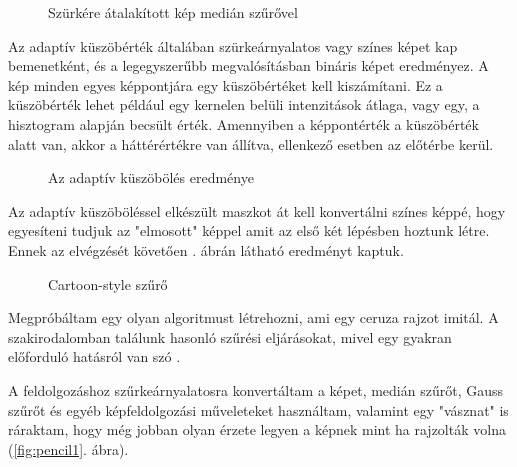 \begin{figure}[ht]
\centering
{}
\caption{Szürkére átalakított kép medián szűrővel} 
\label{fig:cartoon3}
\end{figure}

\newpage


Az adaptív küszöbérték általában szürkeárnyalatos vagy színes képet kap bemenetként, és a legegyszerűbb megvalósításban bináris képet eredményez. A kép minden egyes képpontjára egy küszöbértéket kell kiszámítani. Ez a küszöbérték lehet például egy kernelen belüli intenzitások átlaga, vagy egy, a hisztogram alapján becsült érték. Amennyiben a képpontérték a küszöbérték alatt van, akkor a háttérértékre van állítva, ellenkező esetben az előtérbe kerül.

\begin{figure}[ht]
\centering
{}
\caption{Az adaptív küszöbölés eredménye} 
\label{fig:cartoon4}
\end{figure}


Az adaptív küszöböléssel elkészült maszkot át kell konvertálni színes képpé, hogy egyesíteni tudjuk az "elmosott" képpel amit az első két lépésben hoztunk létre. Ennek az elvégzését követően . ábrán látható eredményt kaptuk.

\begin{figure}[ht]
\centering
{}
\caption{Cartoon-style szűrő } 
\label{fig:cartoon5}
\end{figure}




Megpróbáltam egy olyan algoritmust létrehozni, ami egy ceruza rajzot imitál. A szakirodalomban találunk hasonló szűrési eljárásokat, mivel egy gyakran előforduló hatásról van szó \cite{emami}.

A feldolgozáshoz szűrkeárnyalatosra konvertáltam a képet, medián szűrőt, Gauss szűrőt és egyéb képfeldolgozási műveleteket használtam, valamint egy "vásznat" is ráraktam, hogy még jobban olyan érzete legyen a képnek mint ha rajzolták volna (\ref{fig:pencil1}. ábra).

